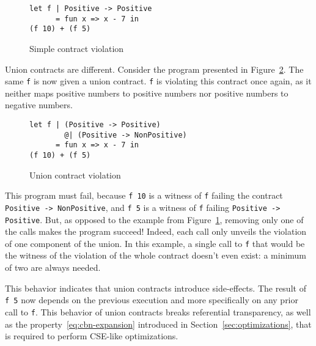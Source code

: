 \documentclass[sigplan,10pt,review,anonymous]{acmart}
\newcommand{\nickel}[1]{\lstinline[language=nickel]{#1}}
\begin{document}
\begin{figure}[h]
\begin{lstlisting}[language=nickel]
let f | Positive -> Positive
      = fun x => x - 7 in
(f 10) + (f 5)
\end{lstlisting}
\caption{Simple contract violation}
\label{fig:pos-to-pos}
\end{figure}

%

Union contracts are different. Consider the program presented in
Figure~\ref{fig:wrong-union-function}. The same \nickel{f} is now given a union
contract. \nickel{f} is violating this contract once again, as it neither maps
positive numbers to positive numbers nor positive numbers to negative numbers.

\begin{figure}[h]
\begin{lstlisting}[language=nickel]
let f | (Positive -> Positive)
        @| (Positive -> NonPositive)
      = fun x => x - 7 in
(f 10) + (f 5)
\end{lstlisting}
\caption{Union contract violation}
\label{fig:wrong-union-function}
\end{figure}

This program must fail, because \nickel{f 10} is a witness of \nickel{f} failing
the contract \nickel{Positive -> NonPositive}, and \nickel{f 5} is a witness of
\nickel{f} failing \nickel{Positive -> Positive}.  But, as opposed to the
example from Figure~\ref{fig:pos-to-pos}, removing only one of the calls makes the
program succeed! Indeed, each call only unveils the violation of one component
of the union. In this example, a single call to \nickel{f} that would be the
witness of the violation of the whole contract doesn't even exist: a minimum of
two are always needed.

This behavior indicates that union contracts introduce side-effects. The result
of \nickel{f 5} now depends on the previous execution and more specifically on
any prior call to \nickel{f}. This behavior of union contracts breaks
referential transparency, as well as the property~\ref{eq:cbn-expansion}
introduced in Section~\ref{sec:optimizations}, that is required to perform
CSE-like optimizations.
\end{document}
